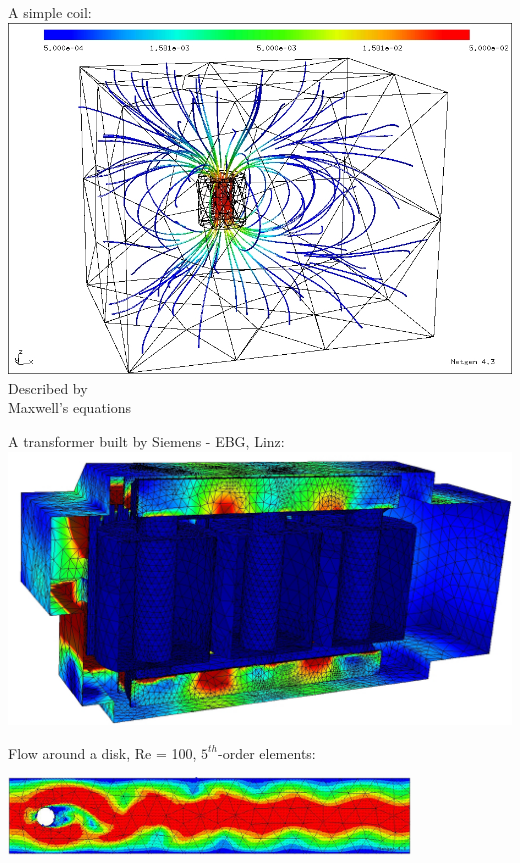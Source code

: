 \documentclass[20pt,landscape,footrule]{foils}
\begin{document}

\begin{minipage}[t]{0.3\textwidth}
A simple coil: \\[2ex]
\includegraphics[width=1\textwidth]{d7_fieldlines.jpg} \\[3ex]
Described by \\ Maxwell's equations
\end{minipage} \hspace{0.1\textwidth}
\begin{minipage}[t]{0.58\textwidth}
A transformer built by Siemens - EBG, Linz: \\[2ex]
\includegraphics[width=1\textwidth]{TA13037alt_losses_clumps_cut.jpg}
\end{minipage}



Flow around a disk, Re = 100,  $5^{th}$-order elements: \\[1em]
\begin{minipage}{0.95\textwidth}
\includegraphics[width=0.8\textwidth]{cylinder_re100.jpg}
\end{minipage}
\end{document}

